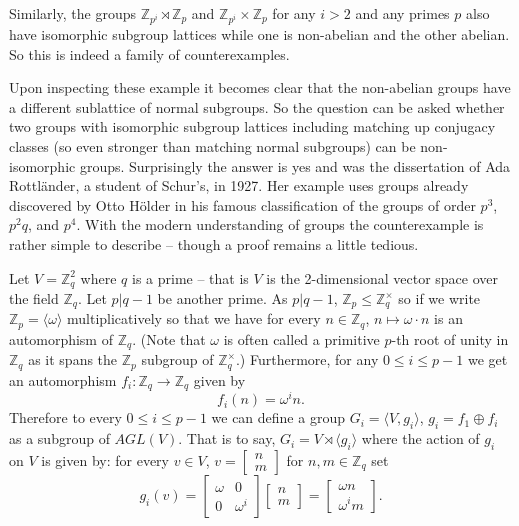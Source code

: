 \documentclass[12pt]{article}
\begin{document}
Similarly, the groups $\mathbb{Z}_{p^i}\rtimes\mathbb{Z}_p$ and $\mathbb{Z}_{p^i}\times \mathbb{Z}_p$ for any $i>2$ and any primes $p$ also have isomorphic subgroup lattices while one is non-abelian and the other abelian.  So this is indeed a family of counterexamples.

Upon inspecting these example it becomes clear that the non-abelian groups have a different sublattice of normal subgroups.  So the question can be asked whether two groups with isomorphic subgroup lattices including matching up conjugacy classes (so even stronger than matching normal subgroups) can be non-isomorphic groups.  Surprisingly the answer is yes and was the dissertation of Ada Rottl\"ander\cite{Rot}, a student of Schur's, in 1927.  Her example uses groups already discovered by Otto H\"older in his famous classification of the groups of order $p^3$, $p^2 q$, and $p^4$.  With the modern understanding of groups the counterexample is rather simple to describe -- though a proof remains a little tedious.

Let $V=\mathbb{Z}_q^2$ where $q$ is a prime -- that is $V$ is the 2-dimensional vector space over the field $\mathbb{Z}_q$.  Let $p|q-1$ be another prime.  As $p|q-1$,  $\mathbb{Z}_p\leq \mathbb{Z}_q^\times$ so if we write $\mathbb{Z}_p=\langle \omega\rangle$ multiplicatively so that we have for every 
$n\in \mathbb{Z}_q$, $n\mapsto \omega\cdot n$ is an automorphism of $\mathbb{Z}_q$.
(Note that $\omega$ is often called a primitive $p$-th root of unity in $\mathbb{Z}_q$ as it spans the $\mathbb{Z}_p$ subgroup of $\mathbb{Z}_q^\times$.)  Furthermore, for any $0\leq i\leq p-1$ we get an automorphism $f_i:\mathbb{Z}_q\rightarrow \mathbb{Z}_q$ given by
  \[f_i(n)=\omega^i n.\]
Therefore to every $0\leq i\leq p-1$ we can define a group $G_i=\langle V,g_i\rangle$, $g_i=f_1\oplus f_i$ as a subgroup of $AGL(V)$.  That is to say, $G_i=V\rtimes \langle g_i\rangle$ where the action of $g_i$ on $V$ is given by: for every $v\in V$, 
$v=\begin{bmatrix}n\\ m\end{bmatrix}$ for $n,m\in \mathbb{Z}_q$ set
   \[g_i(v)=\begin{bmatrix} \omega & 0 \\ 0 & \omega^i\end{bmatrix}\begin{bmatrix} n\\ m\end{bmatrix}
=\begin{bmatrix}\omega n\\ \omega^i m\end{bmatrix}.\]
\end{document}
